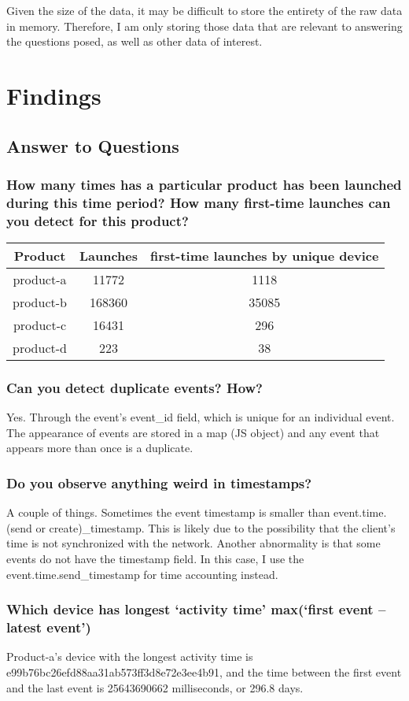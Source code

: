 \documentclass[12pt,letter]{article}
\begin{document}
  Given the size of the data, it may be difficult to store the entirety of the
  raw data in memory. Therefore, I am only storing those data that are relevant
  to answering the questions posed, as well as other data of interest.

  \section{Findings}
  \subsection{Answer to Questions}
  \subsubsection{How many times has a particular product has been launched during this time
  period? How many first-time launches can you detect for this product?}
  \begin{tabular}{c| c c}
      Product & Launches & first-time launches by unique device\\
      \hline
      product-a & 11772 & 1118 \\
      product-b & 168360 & 35085 \\
      product-c & 16431 & 296 \\
      product-d & 223 & 38\\
  \end{tabular}
  \subsubsection{Can you detect duplicate events? How?}
  Yes. Through the event's event\_id field, which is unique for an individual
  event. The appearance of events are stored in a map (JS object) and any event
  that appears more than once is a duplicate.
  \subsubsection{Do you observe anything weird in timestamps?}
  A couple of things. Sometimes the event timestamp is smaller than
  event.time.(send or create)\_timestamp. This is likely due to the possibility
  that the client's time is not synchronized with the network. Another
  abnormality is that some events do not have the timestamp field. In this case,
  I use the event.time.send\_timestamp for time accounting instead.
  \subsubsection{Which device has longest `activity time' max(`first event –
  latest event')}
  Product-a's device with the longest activity time is e99b76bc26efd88aa31ab573ff3d8e72e3ee4b91, and the
  time between the first event and the last event is 25643690662 milliseconds,
  or 296.8 days.
\end{document}
